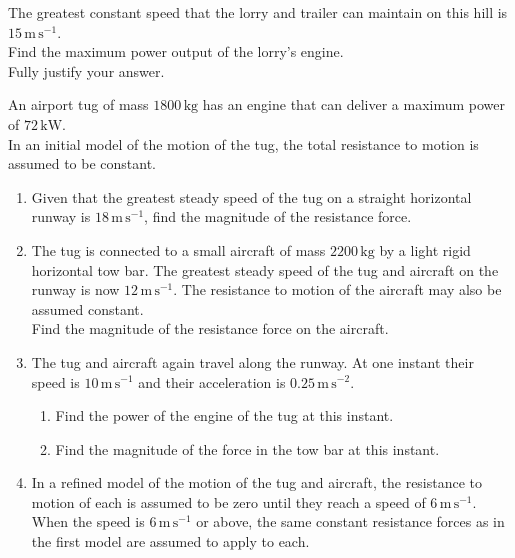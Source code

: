 \documentclass[leqno]{article}
\begin{document}
\begin{enumerate}[
  label=\textbf{\arabic*.},
  leftmargin=*,
  topsep=0pt,
  partopsep=0pt,
  parsep=0pt
]
The greatest constant speed that the lorry and trailer can maintain on this hill is $15\,\mathrm{m\,s^{-1}}$. \\

Find the maximum power output of the lorry's engine. \\

Fully justify your answer.  \\

\newpage

\questionitem

An airport tug of mass $1800\,\mathrm{kg}$ has an engine that can deliver a maximum power of $72\,\mathrm{kW}$. \\

In an initial model of the motion of the tug, the total resistance to motion is assumed to be constant. \\

\begin{enumerate}[label=\textbf{(\roman*)}]
  \item Given that the greatest steady speed of the tug on a straight horizontal runway is $18\,\mathrm{m\,s^{-1}}$, find the magnitude of the resistance force.  \\
  \item The tug is connected to a small aircraft of mass $2200\,\mathrm{kg}$ by a light rigid horizontal tow bar. The greatest steady speed of the tug and aircraft on the runway is now $12\,\mathrm{m\,s^{-1}}$. The resistance to motion of the aircraft may also be assumed constant. \\

  Find the magnitude of the resistance force on the aircraft.  \\
  \item The tug and aircraft again travel along the runway. At one instant their speed is $10\,\mathrm{m\,s^{-1}}$ and their acceleration is $0.25\,\mathrm{m\,s^{-2}}$. \\

  \begin{enumerate}[label=(\alph*)]
    \item Find the power of the engine of the tug at this instant. 
    \item Find the magnitude of the force in the tow bar at this instant. \\
  \end{enumerate}
  \item In a refined model of the motion of the tug and aircraft, the resistance to motion of each is assumed to be zero until they reach a speed of $6\,\mathrm{m\,s^{-1}}$. When the speed is $6\,\mathrm{m\,s^{-1}}$ or above, the same constant resistance forces as in the first model are assumed to apply to each. \\


\end{enumerate}
\end{enumerate}
\end{document}
